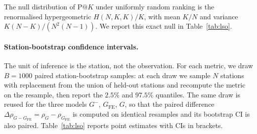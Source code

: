 \documentclass[11pt,a4paper]{article}
\begin{document}
The null distribution of $\mathrm{P@}K$ under uniformly random
ranking is the renormalised hypergeometric $H(N, K, K)/K$, with
mean $K/N$ and variance $K(N-K)/(N^2(N-1))$.  We report this
exact null in Table~\ref{tab:lso}.

\paragraph{Station-bootstrap confidence intervals.}
The unit of inference is the station, not the observation.
For each metric, we draw $B = 1000$ paired station-bootstrap
samples: at each draw we sample $N$ stations with replacement
from the union of held-out stations and recompute the metric on
the resample, then report the $2.5\%$ and $97.5\%$ quantiles.
The same draw is reused for the three models $G^-$,
$G_{\mathrm{FE}}$, $G$, so that the paired difference
$\Delta \rho_{G - G_{\mathrm{FE}}} = \rho_G - \rho_{G_{\mathrm{FE}}}$
is computed on identical resamples and its bootstrap CI is also
paired.  Table~\ref{tab:lso} reports point estimates with CIs
in brackets.
\end{document}
